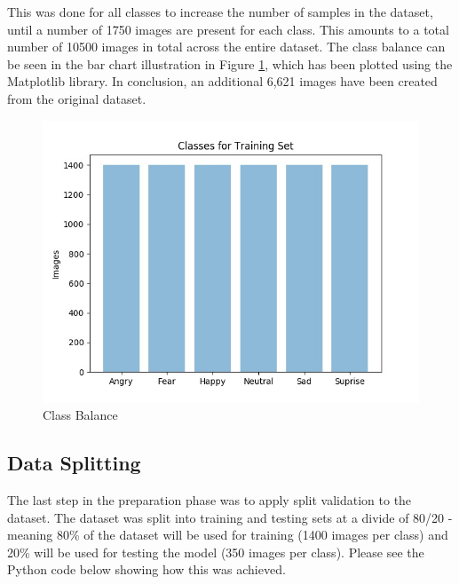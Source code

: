 This was done for all classes to increase the number of samples in the dataset, until a number of 1750 images are present for each class. This amounts to a total number of 10500 images in total across the entire dataset.  The class balance can be seen in the bar chart illustration in Figure \ref{bal}, which has been plotted using the Matplotlib library. In conclusion, an additional 6,621 images have been created from the original dataset.


\begin{figure}[ht]
	\begin{center}
		\advance\leftskip-3cm
		\advance\rightskip-3cm
		\includegraphics[keepaspectratio=true,scale=0.6]{__resources/implementation/balance.jpg}
		\caption{Class Balance}
		\label{bal}
	\end{center}
\end{figure}

\newpage

\subsection{Data Splitting}
The last step in the preparation phase was to apply split validation to the dataset. The dataset was split into training and testing sets at a divide of 80/20 - meaning 80\% of the dataset will be used for training (1400 images per class) and 20\% will be used for testing the model (350 images per class). Please see the Python code below showing how this was achieved.

